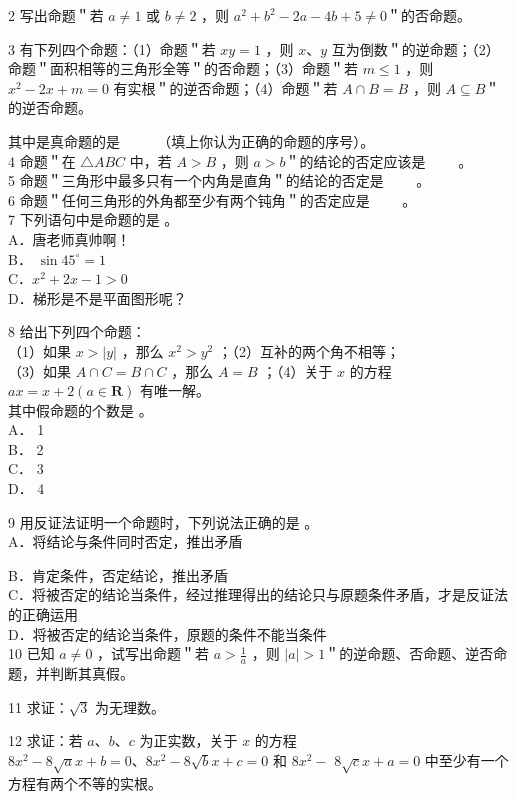 \documentclass[10pt]{article}
\begin{document}
2 写出命题＂若 \(a \neq 1\) 或 \(b \neq 2\) ，则 \(a^{2}+b^{2}-2 a-4 b+5 \neq 0\)＂的否命题。

3 有下列四个命题：（1）命题＂若 \(x y=1\) ，则 \(x 、 y\) 互为倒数＂的逆命题；（2）命题＂面积相等的三角形全等＂的否命题；（3）命题＂若 \(m \leqslant 1\) ，则 \(x^{2}-2 x+m=0\) 有实根＂的逆否命题；（4）命题＂若 \(A \cap B=B\) ，则 \(A \subseteq B\)＂的逆否命题。

其中是真命题的是 \(\qquad\) （填上你认为正确的命题的序号）。\\
4 命题＂在 \(\triangle A B C\) 中，若 \(A>B\) ，则 \(a>b\)＂的结论的否定应该是 \(\qquad\)。\\
5 命题＂三角形中最多只有一个内角是直角＂的结论的否定是 \(\qquad\)。\\
6 命题＂任何三角形的外角都至少有两个钝角＂的否定应是 \(\qquad\)。\\
7 下列语句中是命题的是 。\\
A．唐老师真帅啊！\\
B． \(\sin 45^{\circ}=1\)\\
C．\(x^{2}+2 x-1>0\)\\
D．梯形是不是平面图形呢？

8 给出下列四个命题：\\
（1）如果 \(x>|y|\) ，那么 \(x^{2}>y^{2}\) ；（2）互补的两个角不相等；\\
（3）如果 \(A \cap C=B \cap C\) ，那么 \(A=B\) ；（4）关于 \(x\) 的方程 \(a x=x+2(a \in \mathbf{R})\) 有唯一解。\\
其中假命题的个数是 。\\
A． 1\\
B． 2\\
C． 3\\
D． 4

9 用反证法证明一个命题时，下列说法正确的是 。\\
A．将结论与条件同时否定，推出矛盾

B．肯定条件，否定结论，推出矛盾\\
C．将被否定的结论当条件，经过推理得出的结论只与原题条件矛盾，才是反证法的正确运用\\
D．将被否定的结论当条件，原题的条件不能当条件\\
10 已知 \(a \neq 0\) ，试写出命题＂若 \(a>\frac{1}{a}\) ，则 \(|a|>1\)＂的逆命题、否命题、逆否命题，并判断其真假。

11 求证：\(\sqrt{3}\) 为无理数。

12 求证：若 \(a 、 b 、 c\) 为正实数，关于 \(x\) 的方程 \(8 x^{2}-8 \sqrt{a} x+b=0 、 8 x^{2}-8 \sqrt{b} x+c=0\) 和 \(8 x^{2}-\) \(8 \sqrt{c} x+a=0\) 中至少有一个方程有两个不等的实根。
\end{document}
